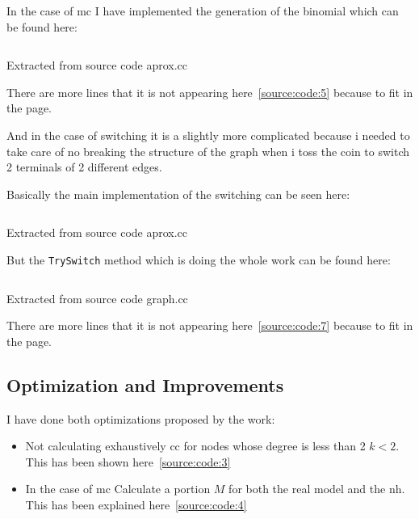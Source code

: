 \documentclass[12pt, a4paper]{article}
\begin{document}
In the case of \acrshort{mc} I have implemented the generation of the \acrshort{binomial} which can be found here:

\begin{listing}[H]
    \inputminted[firstline=74, lastline=98, breaklines]{cpp}{../src/graph/aprox.cc}
    \caption{Extracted from source code aprox.cc}
    \label{source:code:5}
\end{listing} 

There are more lines that it is not appearing here~\ref{source:code:5} because to fit in the page.

And in the case of \acrshort{switching} it is a slightly more complicated because i needed to take care of no breaking the 
structure of the graph when i toss the coin to switch 2 terminals of 2 different edges.

Basically the main implementation of the \acrshort{switching} can be seen here:

\begin{listing}[H]
    \inputminted[firstline=61, lastline=71, breaklines]{cpp}{../src/graph/aprox.cc}
    \caption{Extracted from source code aprox.cc}
    \label{source:code:6}
\end{listing} 

But the \texttt{TrySwitch} method which is doing the whole work can be found here:

\begin{listing}[H]
    \inputminted[firstline=299, lastline=299, breaklines]{cpp}{../src/domain/graph.cc}
    \caption{Extracted from source code graph.cc}
    \label{source:code:7}
\end{listing}

There are more lines that it is not appearing here~\ref{source:code:7} because to fit in the page.

\subsection{Optimization and Improvements}\label{sub:section:opt}
I have done both optimizations proposed by the work:

\begin{itemize}
    \item Not calculating exhaustively \acrshort{cc} for nodes whose degree is less than 2 $k < 2$. This has been
    shown here~\ref{source:code:3}
    \item In the case of \acrshort{mc} Calculate a portion $M$ for both the real model and the \acrshort{nh}. This has 
    been explained here~\ref{source:code:4}
\end{itemize}
\end{document}
